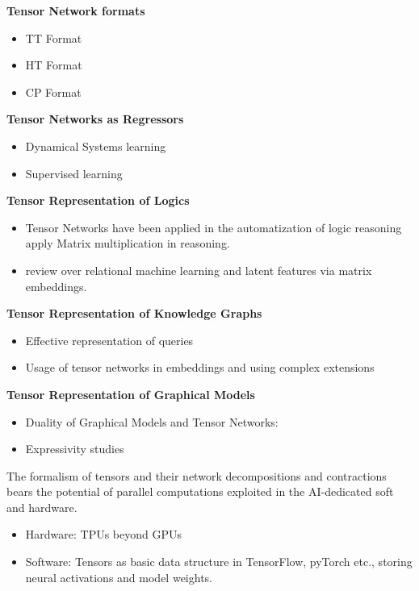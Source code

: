 
\textbf{Tensor Network formats}
\begin{itemize}
    \item TT Format \cite{holtz_manifolds_2012,hackbusch_new_2009}
    \item HT Format \cite{hackbusch_tensor_2012}
    \item CP Format
\end{itemize}

\textbf{Tensor Networks as Regressors}
\begin{itemize}
    \item Dynamical Systems learning \cite{gels_multidimensional_2019, goesmann_tensor_2020}
    \item Supervised learning \cite{stoudenmire_supervised_2016}
\end{itemize}

\textbf{Tensor Representation of Logics}
\begin{itemize}
    \item Tensor Networks have been applied in the automatization of logic reasoning \cite{li_linear_2017, sato_linear_2017} apply Matrix multiplication in reasoning.
    \item \cite{nickel_review_2016} review over relational machine learning and latent features via matrix embeddings.
\end{itemize}

\textbf{Tensor Representation of Knowledge Graphs}
\begin{itemize}
    \item Effective representation of queries
    \item Usage of tensor networks in embeddings \cite{yang_embedding_2015} and using complex extensions \cite{trouillon_complex_2017, trouillon_knowledge_2017}
\end{itemize}

\textbf{Tensor Representation of Graphical Models}
\begin{itemize}
    \item Duality of Graphical Models and Tensor Networks: \cite{robeva_duality_2019}
    \item Expressivity studies \cite{glasser_expressive_2019}
\end{itemize}


The formalism of tensors and their network decompositions and contractions bears the potential of parallel computations exploited in the AI-dedicated soft and hardware.
\begin{itemize}
    \item Hardware: TPUs beyond GPUs
    \item Software: Tensors as basic data structure in TensorFlow, pyTorch etc., storing neural activations and model weights.
\end{itemize}



